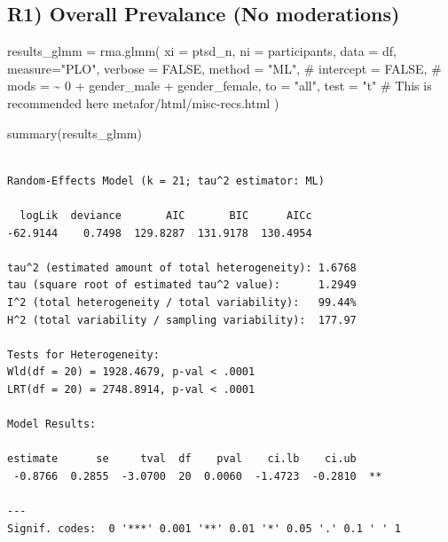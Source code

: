 \documentclass[
  letterpaper,
  DIV=11,
  numbers=noendperiod]{scrartcl}
\newenvironment{Shaded}{\begin{snugshade}}{\end{snugshade}}
\newcommand{\AttributeTok}[1]{\textcolor[rgb]{0.40,0.45,0.13}{#1}}
\newcommand{\CommentTok}[1]{\textcolor[rgb]{0.37,0.37,0.37}{#1}}
\newcommand{\ConstantTok}[1]{\textcolor[rgb]{0.56,0.35,0.01}{#1}}
\newcommand{\FunctionTok}[1]{\textcolor[rgb]{0.28,0.35,0.67}{#1}}
\newcommand{\NormalTok}[1]{\textcolor[rgb]{0.00,0.23,0.31}{#1}}
\newcommand{\OtherTok}[1]{\textcolor[rgb]{0.00,0.23,0.31}{#1}}
\newcommand{\StringTok}[1]{\textcolor[rgb]{0.13,0.47,0.30}{#1}}
\begin{document}
\subsection{R1) Overall Prevalance (No
moderations)}\label{r1-overall-prevalance-no-moderations}

\begin{Shaded}
\begin{Highlighting}[]
\NormalTok{results\_glmm }\OtherTok{=} \FunctionTok{rma.glmm}\NormalTok{(}
  \AttributeTok{xi =} \StringTok{\textasciigrave{}}\AttributeTok{ptsd\_n}\StringTok{\textasciigrave{}}\NormalTok{, }
  \AttributeTok{ni =} \StringTok{\textasciigrave{}}\AttributeTok{participants}\StringTok{\textasciigrave{}}\NormalTok{, }
  \AttributeTok{data =}\NormalTok{ df, }
  \AttributeTok{measure=}\StringTok{"PLO"}\NormalTok{,}
  \AttributeTok{verbose =} \ConstantTok{FALSE}\NormalTok{,}
  \AttributeTok{method =} \StringTok{"ML"}\NormalTok{,}
  \CommentTok{\# intercept = FALSE,}
  \CommentTok{\# mods = \textasciitilde{} 0 + gender\_male + gender\_female,}
  \AttributeTok{to =} \StringTok{"all"}\NormalTok{,}
  \AttributeTok{test =} \StringTok{"t"} \CommentTok{\# This is recommended here metafor/html/misc{-}recs.html}
\NormalTok{)}

\FunctionTok{summary}\NormalTok{(results\_glmm)}
\end{Highlighting}
\end{Shaded}

\begin{verbatim}

Random-Effects Model (k = 21; tau^2 estimator: ML)

  logLik  deviance       AIC       BIC      AICc   
-62.9144    0.7498  129.8287  131.9178  130.4954   

tau^2 (estimated amount of total heterogeneity): 1.6768
tau (square root of estimated tau^2 value):      1.2949
I^2 (total heterogeneity / total variability):   99.44%
H^2 (total variability / sampling variability):  177.97

Tests for Heterogeneity:
Wld(df = 20) = 1928.4679, p-val < .0001
LRT(df = 20) = 2748.8914, p-val < .0001

Model Results:

estimate      se     tval  df    pval    ci.lb    ci.ub     
 -0.8766  0.2855  -3.0700  20  0.0060  -1.4723  -0.2810  ** 

---
Signif. codes:  0 '***' 0.001 '**' 0.01 '*' 0.05 '.' 0.1 ' ' 1
\end{verbatim}
\end{document}
